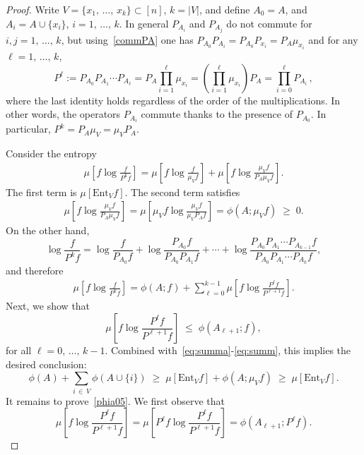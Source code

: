 \documentclass[AHL,Unicode,longabstracts,published]{cedram}
\renewcommand{\leq}{\;\leqslant\;}
\renewcommand{\geq}{\;\geqslant\;}
\newcommand{\ent}{\mathrm{Ent}}
\begin{document}
\begin{proof}
Write $V=\{x_1,\,\dots,\,x_k\}\subset [n]$, $k=|V|$, and define $A_0=A$, and $A_i=A\cup\{x_i\}$, $i=1,\,\dots,\,k$. In general $P_{A_i}$ and $P_{A_j}$ do not commute for $i,j=1,\,\dots,\,k$, but using~\eqref{commPA} one has $P_{A_0}P_{A_i} = P_{A_0}P_{x_i}= P_A\mu_{x_i}$ and for any $\ell=1,\,\dots,\,k$,
\[
P^\ell:=P_{A_0}P_{A_1}\cdots P_{A_\ell} = P_A\prod_{i=1}^\ell \mu_{x_i}= \left(\prod_{i=1}^\ell \mu_{x_i} \right)P_A =\prod_{i=0}^\ell P_{A_i}\,,
\]
where the last identity holds regardless of the order of the multiplications. In other words, the operators $P_{A_i}$ commute thanks to the presence of $P_{A_0}$. In particular, $P^k=P_A\mu_V=\mu_VP_A$.

Consider the entropy
\begin{align}\label{eq:summa}
\mu\left[f\log\frac{f}{P^kf}\right] = \mu\left[f\log\frac{f}{\mu_Vf}\right] + \mu\left[f\log\frac{\mu_Vf}{P_A\mu_Vf}\right].
\end{align}
The first term is $\mu\left[\ent_Vf\right]$. The second term satisfies
\begin{align}\label{eq:summaa}
\mu\left[f\log\frac{\mu_Vf}{P_A\mu_Vf}\right] = \mu\left[\mu_Vf\log\frac{\mu_Vf}{\mu_VP_Af}\right] = \phi(A;\mu_Vf)\geq 0.
\end{align}
On the other hand,
\[
\log\frac{f}{P^kf}=\log\frac{f}{P_{A_0} f} + \log\frac{P_{A_0}f}{P_{A_0}P_{A_1}f}+\cdots+\log\frac{P_{A_0}P_{A_1}\cdots P_{A_{k-1}} f}{P_{A_0}P_{A_1}\cdots P_{A_k} f},
\]
and therefore
\begin{align}\label{eq:summ}
\mu\left[f\log\frac{f}{P^kf}\right] = \phi(A;f)+\sum_{\ell=0}^{k-1}\mu\left[f\log\frac{P^\ell f}{P^{\ell+1}f}\right].
\end{align}
Next, we show that
\begin{equation}\label{phia05}
\mu\left[f\log\frac{P^\ell f}{P^{\ell+1}f}\right]
\leq \phi\left(A_{\ell+1};f\right),
\end{equation}
for all $\ell=0,\,\dots,\,k-1$. Combined with~\eqref{eq:summa}-\eqref{eq:summ}, this implies the desired conclusion:
\begin{equation}\label{phia5x}
\phi(A) + \sum_{i\,\in\,V}\phi(A\cup\{i\})\geq \mu\left[\ent_{V}f \right] + \phi(A;\mu_V f)\geq \mu\left[\ent_{V}f \right].
\end{equation}
It remains to prove~\eqref{phia05}. We first observe that
\begin{equation}\label{phia5xx}
\mu\left[f\log\frac{P^\ell f}{P^{\ell+1}f}\right]=\mu\left[P^\ell f\log\frac{P^\ell f}{P^{\ell+1}f}\right]=\phi\left(A_{\ell+1};P^\ell f\right).

\end{equation}
\end{proof}
\end{document}
